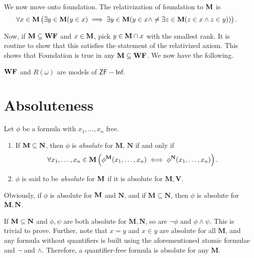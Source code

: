 We now move onto foundation. The relativization of foundation to $\mathbf{M}$ is 
\begin{equation*}
    \forall x\in\mathbf{M}\left(\exists y\in\mathbf{M}(y\in x)\implies\exists y\in\mathbf{M}(y\in x\wedge\ne\exists z\in\mathbf{M}(z\in x\wedge z\in y))\right).
\end{equation*}

Now, if $\mathbf{M}\subseteq\mathbf{WF}$ and $x\in\mathbf{M}$, pick $y\in\mathbf{M}\cap x$ with the smallest rank. It is routine to show that this satisfies the statement of the relativized axiom. This shows that Foundation is true in any $\mathbf{M}\subseteq\mathbf{WF}$. We now have the following. 

\begin{theorem}
    $\mathbf{WF}$ and $R(\omega)$ are models of $\mathsf{ZF} - \mathsf{Inf}$.
\end{theorem}

\section{Absoluteness}

\begin{definition}
    Let $\phi$ be a formula with $x_1,\dots,x_n$ free. 
    \begin{enumerate}[label=(\alph*)]
        \item If $\mathbf{M}\subseteq\mathbf N$, then $\phi$ is \emph{absolute} for $\mathbf M$, $\mathbf N$ if and only if 
        \begin{equation*}
            \forall x_1,\dots,x_n\in\mathbf M\left(\phi^{\mathbf{M}}(x_1,\dots,x_n)\iff\phi^{\mathbf N}(x_1,\dots,x_n)\right).
        \end{equation*}
        \item $\phi$ is said to be \emph{absolute} for $\mathbf{M}$ if it is absolute for $\mathbf M, \mathbf V$.
    \end{enumerate}
    Obviously, if $\phi$ is absolute for $\mathbf{M}$ and $\mathbf N$, and if $\mathbf M\subseteq\mathbf N$, then $\phi$ is absolute for $\mathbf{M},\mathbf N$.
\end{definition}

\begin{remark}
    If $\mathbf{M}\subseteq\mathbf N$ and $\phi,\psi$ are both absolute for $\mathbf M, \mathbf N$, so are $\neg\phi$ and $\phi\wedge\psi$. This is trivial to prove. Further, note that $x = y$ and $x\in y$ are absolute for all $\mathbf M$, and any formula without quantifiers is built using the aforementioned atomic formulae and $\neg$ and $\wedge$. Therefore, a quantifier-free formula is absolute for any $\mathbf M$.
\end{remark}

